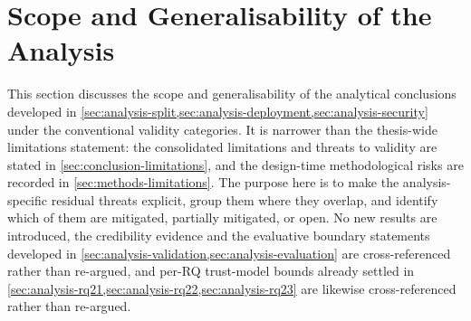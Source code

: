 \section{Scope and Generalisability of the Analysis}
\label{sec:analysis-threats}

This section discusses the scope and generalisability of the analytical
conclusions developed in
\cref{sec:analysis-split,sec:analysis-deployment,sec:analysis-security} under
the conventional validity categories. It is narrower than the thesis-wide
limitations statement: the consolidated limitations and threats to validity
are stated in \cref{sec:conclusion-limitations}, and the design-time
methodological risks are recorded in \cref{sec:methods-limitations}. The
purpose here is to make the analysis-specific residual threats explicit,
group them where they overlap, and identify which of them are mitigated,
partially mitigated, or open. No new results are introduced, the credibility
evidence and the evaluative boundary statements developed in
\cref{sec:analysis-validation,sec:analysis-evaluation} are cross-referenced
rather than re-argued, and per-RQ trust-model bounds already settled in
\cref{sec:analysis-rq21,sec:analysis-rq22,sec:analysis-rq23} are likewise
cross-referenced rather than re-argued.

